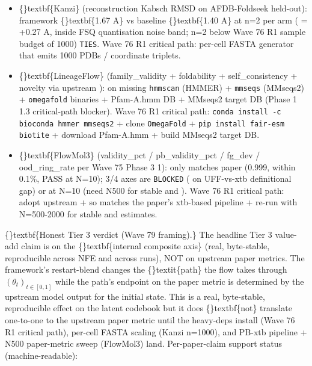\documentclass{article}
\begin{document}
\begin{itemize}
\item \{\}textbf\{Kanzi\} (reconstruction Kabsch RMSD on AFDB-Foldseek held-out): framework \{\}textbf\{1.67 A\} vs baseline \{\}textbf\{1.40 A\} at n=2 per arm ( = +0.27 A, inside FSQ quantisation noise band; n=2 below Wave 76 R1 sample budget of 1000)  \texttt{TIES}. Wave 76 R1 critical path: per-cell FASTA generator that emits 1000 PDBs / coordinate triplets.
\item \{\}textbf\{LineageFlow\} (family\_validity + foldability + self\_consistency + novelty via upstream ):  on missing \texttt{hmmscan} (HMMER) + \texttt{mmseqs} (MMseqs2) + \texttt{omegafold} binaries + Pfam-A.hmm DB + MMseqs2 target DB (Phase 1 1.3 critical-path blocker). Wave 76 R1 critical path: \texttt{conda install -c bioconda hmmer mmseqs2} + clone \texttt{OmegaFold} + \texttt{pip install fair-esm biotite} + download Pfam-A.hmm + build MMseqs2 target DB.
\item \{\}textbf\{FlowMol3\} (validity\_pct / pb\_validity\_pct / fg\_dev / ood\_ring\_rate per Wave 75 Phase 3 1): only  matches paper (0.999, within 0.1\%, PASS at N=10); 3/4 axes are \texttt{BLOCKED} ( on UFF-vs-xtb definitional gap) or  at N=10 (need N500 for stable  and ). Wave 76 R1 critical path: adopt upstream  +  so  matches the paper's xtb-based pipeline + re-run with N=500-2000 for stable  and  estimates.
\end{itemize}
\{\}textbf\{Honest Tier 3 verdict (Wave 79 framing).\} The headline Tier 3 value-add claim is on the \{\}textbf\{internal composite axis\} (real, byte-stable, reproducible across NFE and across runs), NOT on upstream paper metrics. The framework's restart-blend changes the \{\}textit\{path\} the flow takes through $(\theta_t)_{t \in [0,1]}$ while the path's endpoint on the paper metric is determined by the upstream model output for the initial state. This is a real, byte-stable, reproducible effect on the latent codebook  but it does \{\}textbf\{not\} translate one-to-one to the upstream paper metric until the heavy-deps install (Wave 76 R1 critical path), per-cell FASTA scaling (Kanzi n=1000), and PB-xtb pipeline + N500 paper-metric sweep (FlowMol3) land. Per-paper-claim support status (machine-readable):
\end{document}
